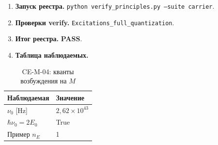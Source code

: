 \label{exp:cem04}
\begin{enumerate}[label=\textbf{Шаг \arabic*:},leftmargin=*,itemsep=0.35em]
\item \textbf{Запуск реестра.} \texttt{python verify\_principles.py --suite carrier}.
\item \textbf{Проверки verify.} \texttt{Excitations\_full\_quantization}.
\item \textbf{Итог реестра.} \textbf{PASS}.
\item \textbf{Таблица наблюдаемых.}
\end{enumerate}
\medskip
\begin{table}[htbp]
\centering
\small
\caption{CE-M-04: кванты возбуждения на $M$}
\label{tab:exp-ce-m-04}
\begin{tabular}{@{}ll@{}}
\toprule
Наблюдаемая & Значение \\
\midrule
$\nu_0$ [Hz] & $2{,}62\times 10^{43}$ \\
$\hbar\nu_0=2E_0$ & True \\
Пример $n_E$ & 1 \\
\bottomrule
\end{tabular}
\end{table}
